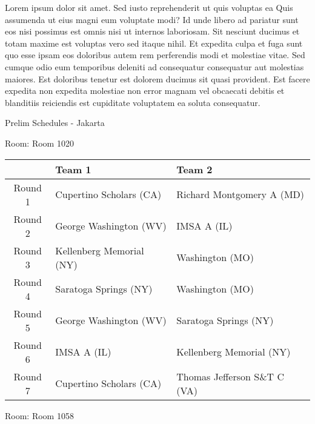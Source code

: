 \documentclass{article}%
\begin{document}
Lorem ipsum dolor sit amet. Sed iusto reprehenderit ut quis voluptas ea Quis assumenda ut eius magni eum voluptate modi? Id unde libero ad pariatur sunt eos nisi possimus est omnis nisi ut internos laboriosam. Sit nesciunt ducimus et totam maxime est voluptas vero sed itaque nihil. Et expedita culpa et fuga sunt quo esse ipsam eos doloribus autem rem perferendis modi et molestiae vitae.\newline%
\newline%
Sed cumque odio eum temporibus deleniti ad consequatur consequatur aut molestias maiores. Est doloribus tenetur est dolorem ducimus sit quasi provident. Est facere expedita non expedita molestiae non error magnam vel obcaecati debitis et blanditiis reiciendis est cupiditate voluptatem ea soluta consequatur.%
\newpage%
\begin{center}%
\begin{Huge}%
Prelim Schedules {-} Jakarta%
\end{Huge}%
\end{center}%
\begin{flushleft}%
\begin{Large}%
Room: Room 1020%
\end{Large}%
\end{flushleft}%
\begin{tabularx}{\textwidth}{|c|Y|Y|}%
\hline%
&Team 1&Team 2\\%
\hline%
Round 1&Cupertino Scholars (CA)&Richard Montgomery A (MD)\\%
Round 2&George Washington (WV)&IMSA A (IL)\\%
Round 3&Kellenberg Memorial (NY)&Washington (MO)\\%
Round 4&Saratoga Springs (NY)&Washington (MO)\\%
Round 5&George Washington (WV)&Saratoga Springs (NY)\\%
Round 6&IMSA A (IL)&Kellenberg Memorial (NY)\\%
Round 7&Cupertino Scholars (CA)&Thomas Jefferson S\&T C (VA)\\%
\hline%
\end{tabularx}%
\vspace*{8pt}%
\linebreak%
\begin{flushleft}%
\begin{Large}%
Room: Room 1058%
\end{Large}%
\end{flushleft}%
\end{document}
